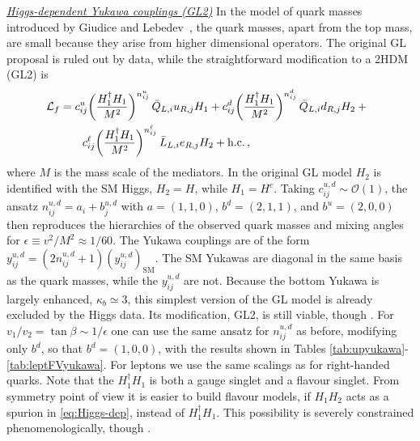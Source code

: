 \documentclass[../report.tex]{subfiles}
\begin{document}
\underline{\it Higgs-dependent Yukawa couplings (GL2)} In the model of
quark masses introduced by Giudice and Lebedev~\cite{Giudice:2008uua},
the quark masses, apart from the top mass, are small because they
arise from higher dimensional operators. The original GL proposal is
ruled out by data, while the straightforward modification to a 2HDM
(GL2) is
\begin{equation}\label{eq:Higgs-dep}
\begin{split}
{\cal L}_{f}&=c_{ij}^{u} \bigg( \frac{H_1^\dagger H_1}{M^2}
  \bigg)^{n_{ij}^{u}} \, \bar Q_{L,i} u_{R,j} H_1 + c_{ij}^{d} \bigg( \frac{H_1^\dagger H_1}{M^2}
  \bigg)^{n_{ij}^{d}} \, \bar Q_{L,i} d_{R,j} H_2 + \phantom{c}\\
  &\qquad c_{ij}^\ell \bigg( \frac{H_1^\dagger H_1}{M^2}
  \bigg)^{n_{ij}^{\ell}} \, \bar L_{L,i} e_{R,j} H_2 +\text{h.c.}\,,
\end{split}
\end{equation}
where $M$ is the mass scale of the mediators.  In the original GL
model $H_2$ is identified with the SM Higgs, $H_2=H$, while
$H_1=H^c$. Taking $c_{ij}^{u,d}\sim {\mathcal
  O}(1)$, the ansatz $n_{ij}^{u,d}=a_i +b_j^{u,d}$ with $a=(1,1,0)$,
$b^d=(2,1,1)$, and $b^u=(2,0,0)$ then reproduces the hierarchies of
the observed quark masses and mixing angles for $\epsilon \equiv
v^2/M^2 \approx 1/60$. The Yukawa couplings are of the form $
y_{ij}^{u,d} = (2n_{ij}^{u,d} + 1) (y_{ij}^{u,d})_\text{SM}$. The SM
Yukawas are diagonal in the same basis as the quark masses,
while the $y_{ij}^{u,d}$ are not.  Because the bottom Yukawa is
largely enhanced, $\kappa_b \simeq 3$, this simplest version of the GL
model is already excluded by the Higgs data. Its modification, GL2, is
still viable, though \cite{Bishara:2015cha}. For
$v_1/v_2=\tan\beta\sim 1/\epsilon$ one can use the same ansatz for
$n_{ij}^{u,d}$ as before, modifying only $b^d$, so that $b^d=(1,0,0)$,
with the results shown in Tables
\ref{tab:upyukawa}-\ref{tab:leptFVyukawa}. For leptons we use the same
scalings as for right-handed quarks. Note that the $H_1^\dagger H_1$
is both a gauge singlet and a flavour singlet. From symmetry point of
view it is easier to build flavour models, if $H_1 H_2$ acts as a
spurion in \eqref{eq:Higgs-dep}, instead of $H_1^\dagger H_1$. This
possibility is severely constrained phenomenologically, though
\cite{Bauer:2015fxa,Bauer:2015kzy}.
\end{document}
